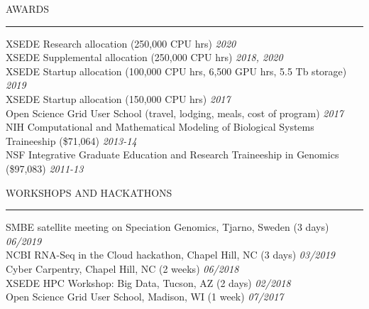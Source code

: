 \documentclass{resume} %
\renewenvironment{rSection}[1]{
\sectionskip
\textcolor{RoyalPurple}{\MakeUppercase{#1}}
\sectionlineskip
\hrule
\begin{list}{}{
\setlength{\leftmargin}{1.5em}
}
\item[]
}{
\end{list}
}
\begin{document}
\begin{rSection}{Awards}

XSEDE Research allocation (250,000 CPU hrs) \hfill{\em 2020}\\
XSEDE Supplemental allocation (250,000 CPU hrs) \hfill{\em 2018, 2020}\\
XSEDE Startup allocation (100,000 CPU hrs, 6,500 GPU hrs, 5.5 Tb storage) \hfill{\em 2019}\\
XSEDE Startup allocation (150,000 CPU hrs) \hfill{\em 2017}\\
Open Science Grid User School (travel, lodging, meals, cost of program) \hfill{\em 2017}\\
NIH Computational and Mathematical Modeling of Biological Systems Traineeship (\$71,064) \hfill {\em 2013-14}\\
NSF Integrative Graduate Education and Research Traineeship in Genomics (\$97,083) \hfill {\em 2011-13}

\end{rSection}


\begin{rSection}{Workshops and Hackathons}

SMBE satellite meeting on Speciation Genomics, Tjarno, Sweden (3 days) \hfill{\em 06/2019}\\
NCBI RNA-Seq in the Cloud hackathon, Chapel Hill, NC (3 days) \hfill {\em 03/2019}\\
Cyber Carpentry, Chapel Hill, NC (2 weeks) \hfill {\em 06/2018}\\
XSEDE HPC Workshop: Big Data, Tucson, AZ (2 days) \hfill {\em 02/2018}\\
Open Science Grid User School, Madison, WI (1 week) \hfill {\em 07/2017}

\end{rSection}

\end{document}
